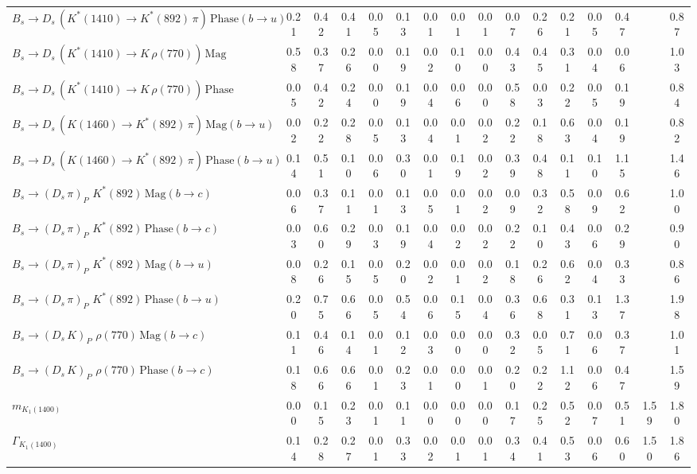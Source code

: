 \begin{tabular}{l  c  c  c  c  c  c  c  c  c  c  c  c  c  c  | c }
$B_s \to D_s \, ( K^{*}(1410) \to K^{*}(892) \, \pi ) \, \text{Phase} (b \to u)$ & 0.21 & 0.42 & 0.41 & 0.05 & 0.13 & 0.01 & 0.01 & 0.01 & 0.07 & 0.26 & 0.21 & 0.05 & 0.47 &  & 0.87 \\ 
$B_s \to D_s \, ( K^{*}(1410) \to K \, \rho(770) ) \, \text{Mag}$ & 0.58 & 0.37 & 0.26 & 0.00 & 0.19 & 0.02 & 0.10 & 0.00 & 0.43 & 0.45 & 0.31 & 0.04 & 0.06 &  & 1.03 \\ 
$B_s \to D_s \, ( K^{*}(1410) \to K \, \rho(770) ) \, \text{Phase}$ & 0.05 & 0.42 & 0.24 & 0.00 & 0.19 & 0.04 & 0.06 & 0.00 & 0.58 & 0.03 & 0.22 & 0.05 & 0.19 &  & 0.84 \\ 
$B_s \to D_s \, ( K(1460) \to K^{*}(892) \, \pi ) \, \text{Mag} (b \to u)$ & 0.02 & 0.22 & 0.28 & 0.05 & 0.13 & 0.04 & 0.01 & 0.02 & 0.22 & 0.18 & 0.63 & 0.04 & 0.19 &  & 0.82 \\ 
$B_s \to D_s \, ( K(1460) \to K^{*}(892) \, \pi ) \, \text{Phase} (b \to u)$ & 0.14 & 0.51 & 0.10 & 0.06 & 0.30 & 0.01 & 0.19 & 0.02 & 0.39 & 0.48 & 0.11 & 0.10 & 1.15 &  & 1.46 \\ 
$B_s \to ( D_s \, \pi)_{P} \, \, K^{*}(892) \, \text{Mag} (b \to c)$ & 0.06 & 0.37 & 0.11 & 0.01 & 0.13 & 0.05 & 0.01 & 0.02 & 0.09 & 0.32 & 0.58 & 0.09 & 0.62 &  & 1.00 \\ 
$B_s \to ( D_s \, \pi)_{P} \, \, K^{*}(892) \, \text{Phase} (b \to c)$ & 0.03 & 0.60 & 0.29 & 0.03 & 0.19 & 0.04 & 0.02 & 0.02 & 0.22 & 0.10 & 0.43 & 0.06 & 0.29 &  & 0.90 \\ 
$B_s \to ( D_s \, \pi)_{P} \, \, K^{*}(892) \, \text{Mag} (b \to u)$ & 0.08 & 0.26 & 0.15 & 0.05 & 0.20 & 0.02 & 0.01 & 0.02 & 0.18 & 0.26 & 0.62 & 0.04 & 0.33 &  & 0.86 \\ 
$B_s \to ( D_s \, \pi)_{P} \, \, K^{*}(892) \, \text{Phase} (b \to u)$ & 0.20 & 0.75 & 0.66 & 0.05 & 0.54 & 0.06 & 0.15 & 0.04 & 0.36 & 0.68 & 0.31 & 0.13 & 1.37 &  & 1.98 \\ 
$B_s \to ( D_s \, K)_{P} \, \, \rho(770) \, \text{Mag} (b \to c)$ & 0.11 & 0.46 & 0.14 & 0.01 & 0.12 & 0.03 & 0.00 & 0.00 & 0.32 & 0.05 & 0.71 & 0.06 & 0.37 &  & 1.01 \\ 
$B_s \to ( D_s \, K)_{P} \, \, \rho(770) \, \text{Phase} (b \to c)$ & 0.18 & 0.66 & 0.66 & 0.01 & 0.23 & 0.01 & 0.00 & 0.01 & 0.20 & 0.22 & 1.12 & 0.06 & 0.47 &  & 1.59 \\ 
$m_{K_1(1400)} $ & 0.00 & 0.15 & 0.23 & 0.01 & 0.11 & 0.00 & 0.00 & 0.00 & 0.17 & 0.25 & 0.52 & 0.07 & 0.51 & 1.59 & 1.80 \\ 
$\Gamma_{K_1(1400)}$ & 0.14 & 0.28 & 0.27 & 0.01 & 0.33 & 0.02 & 0.01 & 0.01 & 0.34 & 0.41 & 0.53 & 0.06 & 0.60 & 1.50 & 1.86 \\ 

\end{tabular}
